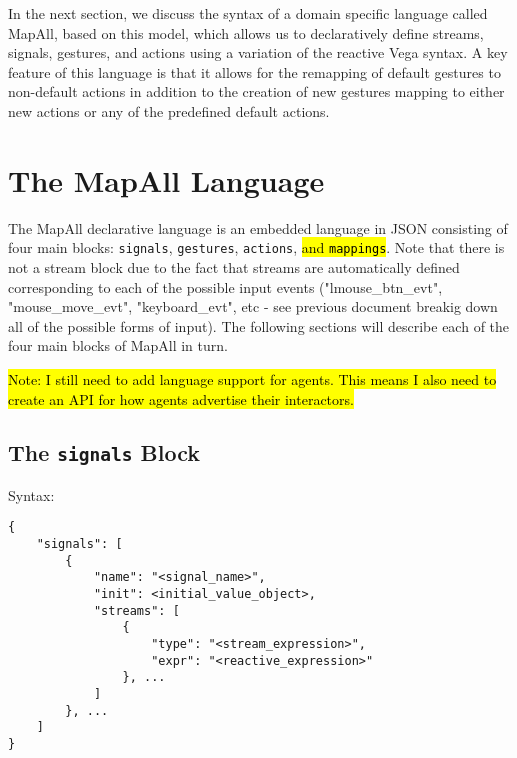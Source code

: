 \documentclass{article}
\begin{document}
In the next section, we discuss the syntax of a domain specific language called MapAll, based on this model, which allows us to declaratively define streams, signals, gestures, and actions using a variation of the reactive Vega syntax. A key feature of this language is that it allows for the remapping of default gestures to non-default actions in addition to the creation of new gestures mapping to either new actions or any of the predefined default actions.


\section{The MapAll Language}

The MapAll declarative language is an embedded language in JSON consisting of four main blocks: \texttt{signals}, \texttt{gestures}, \texttt{actions}, \hl{and \texttt{mappings}}. Note that there is not a stream block due to the fact that streams are automatically defined corresponding to each of the possible input events ("lmouse\_btn\_evt", "mouse\_move\_evt", "keyboard\_evt", etc - see previous document breakig down all of the possible forms of input). The following sections will describe each of the four main blocks of MapAll in turn.

\hl{Note: I still need to add language support for agents. This means I also need to create an API for how agents advertise their interactors.}

\subsection{The \texttt{signals} Block}
Syntax:

\begin{Verbatim}[baselinestretch=1.0]
{
    "signals": [
        {
            "name": "<signal_name>",
            "init": <initial_value_object>,
            "streams": [
                {
                    "type": "<stream_expression>",
                    "expr": "<reactive_expression>"
                }, ...
            ]
        }, ...
    ]
}
\end{Verbatim}
\end{document}
